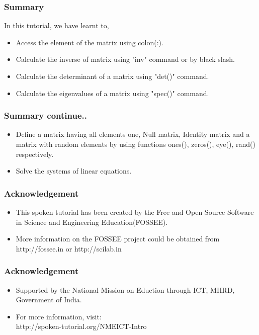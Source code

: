 \documentclass[17pt]{beamer}
\begin{document}
\begin{frame}[fragile]
\frametitle{Summary}
In this tutorial, we have learnt to,
\begin{itemize}
\item Access the element of the matrix using colon(:).
\item Calculate the inverse of matrix using "inv" command or by black slash.\pause
\item Calculate the determinant of a matrix using "det()" command.\pause
\item Calculate the eigenvalues of a matrix using "spec()" command.
\end{itemize}
\end{frame}




\begin{frame}[fragile]
\frametitle{Summary continue..}
\begin{itemize}

\item Define a matrix having all elements one, Null matrix, Identity matrix
and a matrix with random elements by using functions ones(), zeros(), eye(), rand() respectively.\pause
\item Solve the systems of linear equations.
\end{itemize}
\end{frame}

\begin{frame}[fragile]
\frametitle{Acknowledgement}
\begin{itemize}
\item This spoken tutorial has been created by the Free and Open Source Software in Science and Engineering Education(FOSSEE).\pause
\item More information on the FOSSEE project could be obtained from {\color{magenta}http://fossee.in} or {\color{magenta}http://scilab.in}
\end{itemize}
\end{frame}


\begin{frame}[fragile]
\frametitle{Acknowledgement}
\begin{itemize}
\item Supported by the National Mission on Eduction through ICT, MHRD, Government of India.\pause
\item For more information, visit: \\
	{\color{magenta}http://spoken-tutorial.org/NMEICT-Intro}

\end{itemize}
\end{frame}
\end{document}
